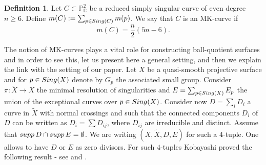 \documentclass[11pt]{amsart}
\theoremstyle{plain}
\theoremstyle{definition}
\newtheorem{definition}[thm]{Definition}
\numberwithin{equation}{section}
\begin{document}
\begin{definition}
\label{D2}
Let $C \subset \mathbb{P}^{2}_{\mathbb{C}}$ be a reduced simply singular curve of even degree $n\geq 6$. Define $m(C):=\sum_{p \in {\rm Sing}(C)}m(p)$. We say that $C$ is an MK-curve if
$$m(C) = \frac{n}{2}(5n-6).$$
\end{definition}
The notion of MK-curves plays a vital role for constructing ball-quotient surfaces and in order to see this, let us present here a general setting, and then we explain the link with the setting of our paper. Let $X$ be a quasi-smooth projective surface and for $p \in {\rm Sing}(X)$ denote by $G_{p}$ the associated small group. Consider $\pi: \tilde{X} \rightarrow X$ the minimal resolution of singularities and $E = \sum_{p \in {\rm Sing}(X)}E_{p}$ the union of the exceptional curves over $p \in {\rm Sing}(X)$. Consider now $D = \sum_{i}D_{i}$ a curve in $\tilde{X}$ with normal crossings and such that the connected components  $D_{i}$ of $D$ can be written as  $D_{i}=\sum D_{ij}$, where $D_{ij}$ are irreducible and distinct. Assume  that ${\rm supp}\, D \cap {\rm supp} \, E = \emptyset$. We are writing $(X,\tilde{X},D,E)$ for such a $4$-tuple. One allows to have $D$ or $E$ as zero divisors.
For such $4$-tuples Kobayashi proved the following result - see \cite[3.2.3 Theorem]{Ivinskis} and \cite{Kob1, Kob2}.
\end{document}
